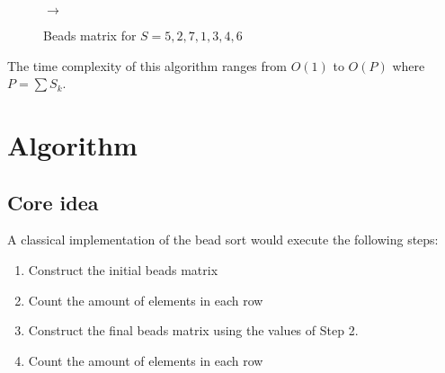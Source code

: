 \documentclass{article}
\begin{document}
\begin{figure}[h]
    \centering
  
    \quad\(\longrightarrow\)\quad
  
    \caption{Beads matrix for \(S = 5,2,7,1,3,4,6\)}
    \label{fig:both}
\end{figure}

The time complexity of this algorithm ranges from \(O(1)\)
to \(O(P)\) where \(P=\sum S_k\).

\pagebreak

\section{Algorithm}

\subsection{Core idea}

A classical implementation of the bead sort would execute the following steps:
\begin{enumerate}
    \item Construct the initial beads matrix
    \item Count the amount of elements in each row
    \item Construct the final beads matrix using the values of Step 2.
    \item Count the amount of elements in each row
\end{enumerate}
\end{document}
